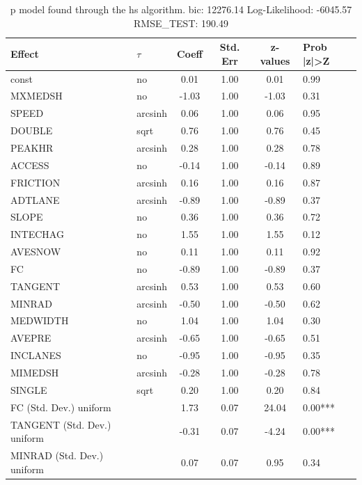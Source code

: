 \begin{table}
	\caption{p model found through the hs algorithm. bic: 12276.14 Log-Likelihood: -6045.57 RMSE_TEST: 190.49}
	\begin{center}
		\begin{tabular}{|l|l|c|c|c|l|}
			\hline
			Effect & $\tau$ & Coeff & Std. Err & z-values & Prob |z|>Z \\
			\hline
			const & no & 0.01 & 1.00 & 0.01 & 0.99 \\
			\hline
			MXMEDSH & no & -1.03 & 1.00 & -1.03 & 0.31 \\
			\hline
			SPEED & arcsinh & 0.06 & 1.00 & 0.06 & 0.95 \\
			\hline
			DOUBLE & sqrt & 0.76 & 1.00 & 0.76 & 0.45 \\
			\hline
			PEAKHR & arcsinh & 0.28 & 1.00 & 0.28 & 0.78 \\
			\hline
			ACCESS & no & -0.14 & 1.00 & -0.14 & 0.89 \\
			\hline
			FRICTION & arcsinh & 0.16 & 1.00 & 0.16 & 0.87 \\
			\hline
			ADTLANE & arcsinh & -0.89 & 1.00 & -0.89 & 0.37 \\
			\hline
			SLOPE & no & 0.36 & 1.00 & 0.36 & 0.72 \\
			\hline
			INTECHAG & no & 1.55 & 1.00 & 1.55 & 0.12 \\
			\hline
			AVESNOW & no & 0.11 & 1.00 & 0.11 & 0.92 \\
			\hline
			FC & no & -0.89 & 1.00 & -0.89 & 0.37 \\
			\hline
			TANGENT & arcsinh & 0.53 & 1.00 & 0.53 & 0.60 \\
			\hline
			MINRAD & arcsinh & -0.50 & 1.00 & -0.50 & 0.62 \\
			\hline
			MEDWIDTH & no & 1.04 & 1.00 & 1.04 & 0.30 \\
			\hline
			AVEPRE & arcsinh & -0.65 & 1.00 & -0.65 & 0.51 \\
			\hline
			INCLANES & no & -0.95 & 1.00 & -0.95 & 0.35 \\
			\hline
			MIMEDSH & arcsinh & -0.28 & 1.00 & -0.28 & 0.78 \\
			\hline
			SINGLE & sqrt & 0.20 & 1.00 & 0.20 & 0.84 \\
			\hline
			FC (Std. Dev.) uniform &  & 1.73 & 0.07 & 24.04 & 0.00*** \\
			\hline
			TANGENT (Std. Dev.) uniform &  & -0.31 & 0.07 & -4.24 & 0.00*** \\
			\hline
			MINRAD (Std. Dev.) uniform &  & 0.07 & 0.07 & 0.95 & 0.34 \\

\end{tabular}
\end{center}
\end{table}

